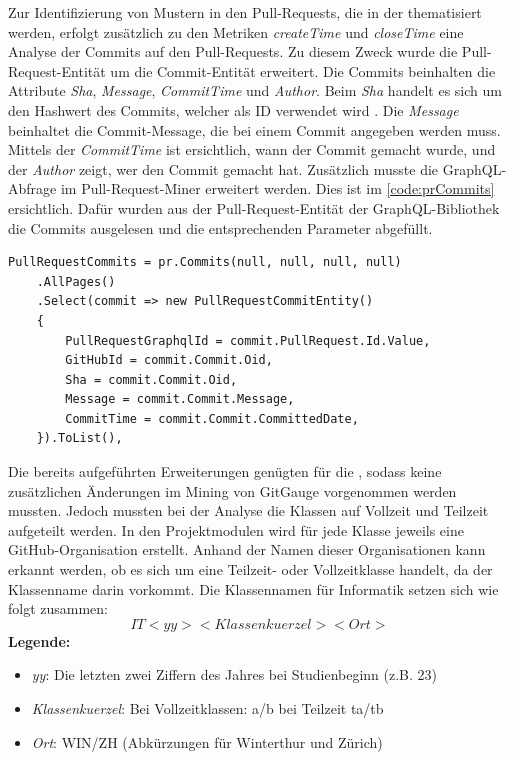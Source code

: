 Zur Identifizierung von Mustern in den Pull-Requests, die in der  thematisiert werden, erfolgt zusätzlich zu den Metriken \textit{createTime} und \textit{closeTime} eine Analyse der Commits auf den Pull-Requests. Zu diesem Zweck wurde die Pull-Request-Entität um die Commit-Entität erweitert. Die Commits beinhalten die Attribute \textit{Sha}, \textit{Message}, \textit{CommitTime} und \textit{Author}. Beim \textit{Sha} handelt es sich um den Hashwert des Commits, welcher als ID verwendet wird \parencite{noauthor_git_nodate}. Die \textit{Message} beinhaltet die Commit-Message, die bei einem Commit angegeben werden muss. Mittels der \textit{CommitTime} ist ersichtlich, wann der Commit gemacht wurde, und der \textit{Author} zeigt, wer den Commit gemacht hat. Zusätzlich musste die GraphQL-Abfrage im Pull-Request-Miner erweitert werden. Dies ist im \autoref{code:prCommits} ersichtlich. Dafür wurden aus der Pull-Request-Entität der GraphQL-Bibliothek die Commits ausgelesen und die entsprechenden Parameter abgefüllt.
\begin{lstlisting}[language=CSharp, caption={GraphQL-Abfrage Pull-Request-Commits}, label={code:prCommits}]
PullRequestCommits = pr.Commits(null, null, null, null)
    .AllPages()
    .Select(commit => new PullRequestCommitEntity()
    {
        PullRequestGraphqlId = commit.PullRequest.Id.Value,
        GitHubId = commit.Commit.Oid,
        Sha = commit.Commit.Oid,
        Message = commit.Commit.Message,
        CommitTime = commit.Commit.CommittedDate,
    }).ToList(),
\end{lstlisting}

\newpage
Die bereits aufgeführten Erweiterungen genügten für die , sodass keine zusätzlichen Änderungen im Mining von GitGauge vorgenommen werden mussten. Jedoch mussten bei der Analyse die Klassen auf Vollzeit und Teilzeit aufgeteilt werden. In den Projektmodulen wird für jede Klasse jeweils eine GitHub-Organisation erstellt. Anhand der Namen dieser Organisationen kann erkannt werden, ob es sich um eine Teilzeit- oder Vollzeitklasse handelt, da der Klassenname darin vorkommt. Die Klassennamen für Informatik setzen sich wie folgt zusammen: 
\begin{equation}
IT<yy><Klassenkuerzel><Ort>
\end{equation}
\noindent\textbf{Legende:}
\begin{itemize}
  \item \textit{yy}: Die letzten zwei Ziffern des Jahres bei Studienbeginn (z.B. 23)
  \item\textit{Klassenkuerzel}: Bei Vollzeitklassen: a/b bei Teilzeit ta/tb
  \item\textit{Ort}: WIN/ZH (Abkürzungen für Winterthur und Zürich)
\end{itemize}

